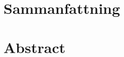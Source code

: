 \thispagestyle{empty}

\section*{Sammanfattning}

\newpage

\thispagestyle{empty}

\section*{Abstract}

\newpage